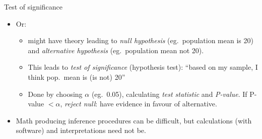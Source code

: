 \begin{frame}{Test of significance}
\begin{itemize}
\item Or: 
  \begin{itemize}
  \item 
might have theory leading to {\em null hypothesis} (eg.\ population mean is 20) and {\em alternative hypothesis} (eg.\ population mean not 20).
\item This leads to {\em test of significance} (hypothesis test): ``based on my sample, I think pop.\ mean is (is not) 20''
\item Done by choosing $\alpha$ (eg.\ 0.05), calculating {\em test statistic} and {\em P-value}. If P-value $< \alpha$, {\em reject null}: have evidence in favour of alternative.
  \end{itemize}
\item Math producing inference procedures can be difficult, but calculations (with software) and interpretations need not be.
  \end{itemize}


\end{frame}

